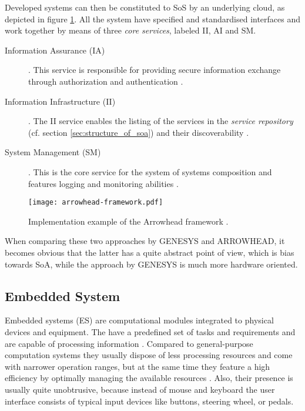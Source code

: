 Developed systems can then be constituted to SoS by an underlying cloud, as depicted in figure \ref{fig:arrowhead-framework}. All the system have specified and standardised interfaces and work together by means of three \emph{core services}, labeled II, AI and SM.
\begin{description}
\item [Information Assurance (IA)] .
This service is responsible for providing secure information exchange through authorization and authentication \cite{arrowhead:presentation}.
\item [Information Infrastructure (II)] .
The II service enables the listing of the services in the \emph{service repository} (cf. section \ref{sec:structure_of_soa}) and their discoverability \cite{arrowhead:presentation}.
\item [System Management (SM)] .
This is the core service for the system of systems composition and features logging and monitoring abilities \cite{arrowhead:presentation}.
\end{description}

\begin{figure}[!htbp]
\centering
\texttt{[image: arrowhead-framework.pdf]}
\caption{Implementation example of the Arrowhead framework \cite{arrowhead:presentation}.}
\label{fig:arrowhead-framework}
\end{figure}

When comparing these two approaches by GENESYS and ARROWHEAD, it becomes obvious that the latter has a quite abstract point of view, which is bias towards SoA, while the approach by GENESYS is much more hardware oriented.



\subsection{Embedded System}
\label{sec:embedded_system}

Embedded systems (ES) are computational modules integrated to physical devices and equipment. The have a predefined set of tasks and requirements and are capable of processing information \cite{rodrigues2011} \cite[p.xiii]{marwedel}. Compared to general-purpose computation systems they usually dispose of less processing resources and come with narrower operation ranges, but at the same time they feature a high efficiency by optimally managing the available resources \cite[p.283]{alippi} \cite[p.5]{marwedel}. Also, their presence is usually quite unobtrusive, because instead of mouse and keyboard the user interface consists of typical input devices like buttons, steering wheel, or pedals.

